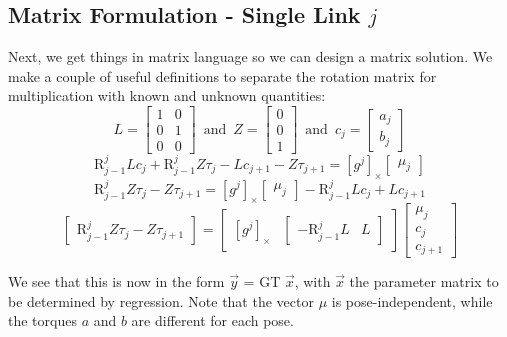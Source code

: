 \documentclass[letterpaper,12pt]{article}
\newcommand{\R}[2]{{\mbox{R}}^{#1}_{#2}}
\newcommand{\onevec}[1]
   {\left[ \begin{array}{c} #1 \end{array} \right] }
\newcommand{\twovec}[2]
   {\left[ \begin{array}{c} #1 \\ #2 \end{array} \right] }
\newcommand{\threevec}[3]
   {\left[ \begin{array}{c} #1 \\ #2 \\ #3 \end{array} \right] }
\begin{document}
   \subsection{Matrix Formulation - Single Link $j$}
      Next, we get things in matrix language so we can design a matrix
      solution.
      We make a couple of useful definitions to separate the rotation
      matrix for multiplication with known and unknown quantities:
      \begin{equation}
         L =
         \left[ \begin{array}{cc}
            1 & 0 \\ 0 & 1 \\ 0 & 0
         \end{array} \right]
         \,\,\,\mbox{and}\,\,\,
         Z = \threevec{0}{0}{1}
         \,\,\,\mbox{and}\,\,\,
         c_j = \twovec{a_j}{b_j}
      \end{equation}
      \begin{equation}
         \R{j}{j-1} L c_j
         + \R{j}{j-1} Z \tau_j
         - L c_{j+1}
         - Z \tau_{j+1}
         = \left[ g^j \right]_{\times} \onevec{\mu_j}
      \end{equation}
      \begin{equation} \label{eqn:single-link}
         \R{j}{j-1} Z \tau_j - Z \tau_{j+1}
         = \left[ g^j \right]_{\times} \onevec{\mu_j}
         - \R{j}{j-1} L c_j
         + L c_{j+1}
      \end{equation}
      \begin{equation}
         \onevec{ \R{j}{j-1} Z \tau_j - Z \tau_{j+1} }
         =
         \left[ \begin{array}{cc}
            \left[ g^j \right]_{\times}
            &
            \left[ \begin{array}{cc}
               - \R{j}{j-1} L
               &
               L
            \end{array} \right]
         \end{array} \right]
         \left[ \begin{array}{c}
            \mu_j \\
            c_j \\
            c_{j+1}
         \end{array} \right]
      \end{equation}
      
      We see that this is now in the form $\vec{y}$ = GT $\vec{x}$,
      with $\vec{x}$ the parameter matrix to be determined by regression.
      Note that the vector $\mu$ is pose-independent, while the
      torques $a$ and $b$ are different for each pose.
\end{document}

